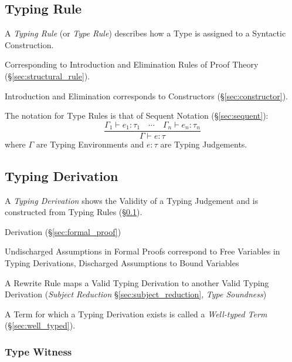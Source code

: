 \subsection{Typing Rule}\label{sec:typing_rule}

A \emph{Typing Rule} (or \emph{Type Rule}) describes how a Type is
assigned to a Syntactic Construction.

Corresponding to Introduction and Elimination Rules of Proof Theory
(\S\ref{sec:structural_rule}).

Introduction and Elimination corresponds to Constructors
(\S\ref{sec:constructor}).

The notation for Type Rules is that of Sequent Notation
(\S\ref{sec:sequent}):
\[
  {
    \frac
    { \Gamma_1 \vdash e_1:\tau_1 \quad \cdots
      \quad \Gamma_n \vdash e_n:\tau_n }
    { \Gamma \vdash e:\tau }
  }
\]
where $\Gamma$ are Typing Environments and $e:\tau$ are Typing
Judgements.



\subsection{Typing Derivation}\label{sec:typing_derivation}

A \emph{Typing Derivation} shows the Validity of a Typing Judgement
and is constructed from Typing Rules (\S\ref{sec:typing_rule}).

Derivation (\S\ref{sec:formal_proof})

Undischarged Assumptions in Formal Proofs correspond to Free Variables
in Typing Derivations, Discharged Assumptions to Bound Variables

A Rewrite Rule maps a Valid Typing Derivation to another Valid Typing
Derivation (\emph{Subject Reduction} \S\ref{sec:subject_reduction},
\emph{Type Soundness}) \cite{wadler14}

A Term for which a Typing Derivation exists is called a
\emph{Well-typed Term} (\S\ref{sec:well_typed}).



\subsubsection{Type Witness}\label{sec:type_witness}

